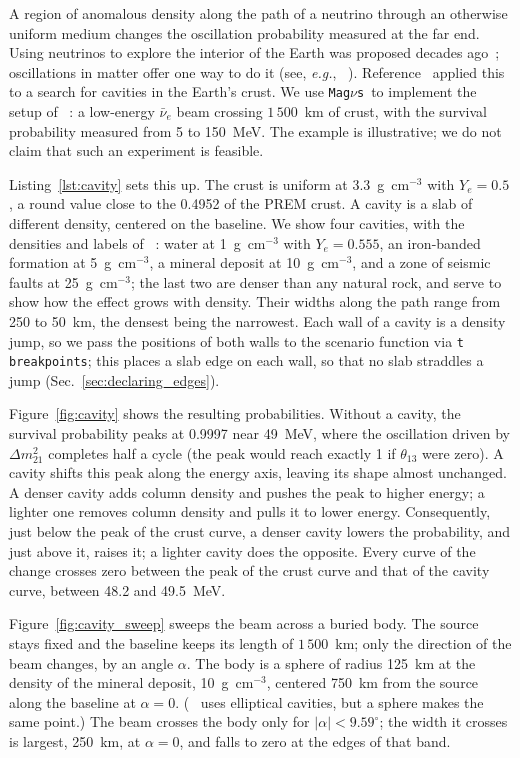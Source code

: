 \documentclass[final,5p,times,twocolumn,sort,compress]{elsarticle}
\makeatletter
\newcommand{\eg}{{\it e.g.}}
\DeclareRobustCommand{\_}{%
  \ifmmode\nfss@text{\textunderscore}\else\textunderscore\allowbreak\fi}
\providecommand{\Ref}{}
\newcommand{\magnus}{{\tt Mag}\ensuremath{\nu}{\tt s}}
\makeatother
\begin{document}
A region of anomalous density along the path of a neutrino through an otherwise uniform medium changes the oscillation probability measured at the far end. Using neutrinos to explore the interior of the Earth was proposed decades ago~\cite{DeRujula:1983ya, Ermilova:1986ph}; oscillations in matter offer one way to do it (see, \eg, \Ref~\cite{Winter:2006vg}). Reference~\cite{Arguelles:2012nw} applied this to a search for cavities in the Earth's crust. We use \magnus\ to implement the setup of \Ref\ \cite{Arguelles:2012nw}: a low-energy $\bar{\nu}_e$ beam crossing $1\,500$~km of crust, with the survival probability measured from 5 to 150~MeV. The example is illustrative; we do not claim that such an experiment is feasible.

Listing~\ref{lst:cavity} sets this up. The crust is uniform at 3.3~g~cm$^{-3}$ with $Y_e = 0.5$, a round value close to the 0.4952 of the PREM crust. A cavity is a slab of different density, centered on the baseline. We show four cavities, with the densities and labels of \Ref\ \cite{Arguelles:2012nw}: water at 1~g~cm$^{-3}$ with $Y_e = 0.555$, an iron-banded formation at 5~g~cm$^{-3}$, a mineral deposit at 10~g~cm$^{-3}$, and a zone of seismic faults at 25~g~cm$^{-3}$; the last two are denser than any natural rock, and serve to show how the effect grows with density. Their widths along the path range from 250 to 50~km, the densest being the narrowest. Each wall of a cavity is a density jump, so we pass the positions of both walls to the scenario function via {\tt t\_breakpoints}; this places a slab edge on each wall, so that no slab straddles a jump (Sec.~\ref{sec:declaring_edges}).

Figure~\ref{fig:cavity} shows the resulting probabilities. Without a cavity, the survival probability peaks at 0.9997 near 49~MeV, where the oscillation driven by $\Delta m^2_{21}$ completes half a cycle (the peak would reach exactly 1 if $\theta_{13}$ were zero). A cavity shifts this peak along the energy axis, leaving its shape almost unchanged. A denser cavity adds column density and pushes the peak to higher energy; a lighter one removes column density and pulls it to lower energy. Consequently, just below the peak of the crust curve, a denser cavity lowers the probability, and just above it, raises it; a lighter cavity does the opposite. Every curve of the change crosses zero between the peak of the crust curve and that of the cavity curve, between 48.2 and 49.5~MeV.

Figure~\ref{fig:cavity_sweep} sweeps the beam across a buried body. The source stays fixed and the baseline keeps its length of $1\,500$~km; only the direction of the beam changes, by an angle $\alpha$. The body is a sphere of radius 125~km at the density of the mineral deposit, 10~g~cm$^{-3}$, centered 750~km from the source along the baseline at $\alpha = 0$. (\Ref\ \cite{Arguelles:2012nw} uses elliptical cavities, but a sphere makes the same point.) The beam crosses the body only for $\lvert \alpha \rvert < 9.59^\circ$; the width it crosses is largest, 250~km, at $\alpha = 0$, and falls to zero at the edges of that band.
\end{document}
